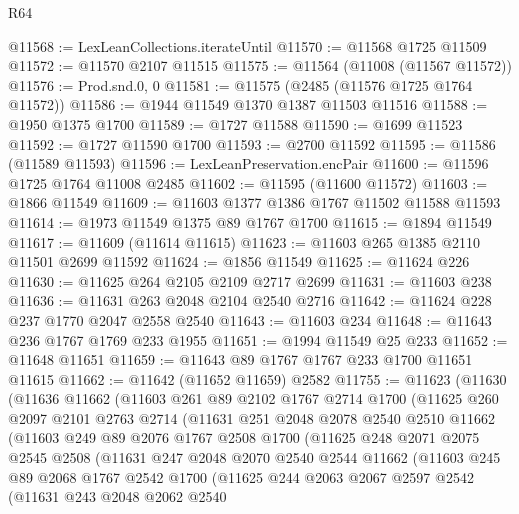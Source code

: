 \begin{lexlean}{R64}
\begin{coremodule}
@11568 := LexLeanCollections.iterateUntil
@11570 := @11568 @1725 @11509
@11572 := @11570 @2107 @11515
@11575 := @11564 (@11008 (@11567 @11572))
@11576 := Prod.snd.{0, 0}
@11581 := @11575 (@2485 (@11576 @1725 @1764 @11572))
@11586 := @1944 @11549 @1370 @1387 @11503 @11516
@11588 := @1950 @1375 @1700
@11589 := @1727 @11588
@11590 := @1699 @11523
@11592 := @1727 @11590 @1700
@11593 := @2700 @11592
@11595 := @11586 (@11589 @11593)
@11596 := LexLeanPreservation.encPair
@11600 := @11596 @1725 @1764 @11008 @2485
@11602 := @11595 (@11600 @11572)
@11603 := @1866 @11549
@11609 := @11603 @1377 @1386 @1767 @11502 @11588 @11593
@11614 := @1973 @11549 @1375 @89 @1767 @1700
@11615 := @1894 @11549
@11617 := @11609 (@11614 @11615)
@11623 := @11603 @265 @1385 @2110 @11501 @2699 @11592
@11624 := @1856 @11549
@11625 := @11624 @226
@11630 := @11625 @264 @2105 @2109 @2717 @2699
@11631 := @11603 @238
@11636 := @11631 @263 @2048 @2104 @2540 @2716
@11642 := @11624 @228 @237 @1770 @2047 @2558 @2540
@11643 := @11603 @234
@11648 := @11643 @236 @1767 @1769 @233 @1955
@11651 := @1994 @11549 @25 @233
@11652 := @11648 @11651
@11659 := @11643 @89 @1767 @1767 @233 @1700 @11651 @11615
@11662 := @11642 (@11652 @11659) @2582
@11755 := @11623
    (@11630
      (@11636
        @11662
        (@11603
          @261
          @89
          @2102
          @1767
          @2714
          @1700
          (@11625
            @260
            @2097
            @2101
            @2763
            @2714
            (@11631
              @251
              @2048
              @2078
              @2540
              @2510
              @11662
              (@11603
                @249
                @89
                @2076
                @1767
                @2508
                @1700
                (@11625
                  @248
                  @2071
                  @2075
                  @2545
                  @2508
                  (@11631
                    @247
                    @2048
                    @2070
                    @2540
                    @2544
                    @11662
                    (@11603
                      @245
                      @89
                      @2068
                      @1767
                      @2542
                      @1700
                      (@11625
                        @244
                        @2063
                        @2067
                        @2597
                        @2542
                        (@11631
                          @243
                          @2048
                          @2062
                          @2540

\end{coremodule}
\end{lexlean}
